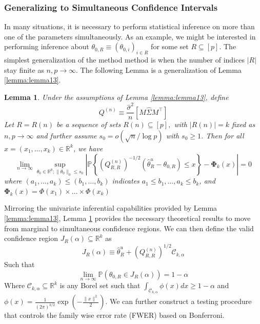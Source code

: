 \documentclass{article}
\newtheorem{lemma}[theorem]{Lemma}
\begin{document}
\subsubsection{Generalizing to Simultaneous Confidence Intervals}
\label{sec:2.3.3}
In many situations, it is necessary to perform statistical inference on more than one of the parameters simultaneously. As an example, we might be interested in performing inference about $\theta_{0,R}\equiv (\theta_{0,i})_{i \in R}$ for some set $R \subseteq [p]$. The simplest generalization of the method method is when the number of indices $|R|$ stay finite as $n, p \to \infty$. The following Lemma is a generalization of Lemma \ref{lemma:lemma13}.
\begin{lemma}
\label{lemma:lemma19}
Under the assumptions of Lemma \ref{lemma:lemma13}, define 
\begin{equation}
Q^{(n)} \equiv \frac{\hat{\sigma}^2}{n}[M \hat{\Sigma}M^\top]
\end{equation}
Let $R=R(n)$ be a sequence of sets $R(n) \subseteq [p],$ with $|R(n)| = k$ fixed as $n, p \to \infty$ and further assume $s_0 = o(\sqrt{n}/\log p)$ with $s_0\ge1$. Then for all $x = (x_1, \dots, x_k) \in \mathbb{R}^k$, we have
\begin{equation}
    \lim_{n \to \infty}\sup_{\theta_0 \in \mathbb{R}^p; \|\theta_0\|_0 \le s_0}\left|\mathbb{P}\left\{\left(Q^{(n)}_{R,R}\right)^{-1/2} (\hat{\theta}^u_R - \theta_{0, R}) \le x \right\}  -\mathbf{\Phi}_k(x)\right| =0
\end{equation}
where $(a_1, \dots, a_k) \le (b_1, \dots, b_k)$ indicates $a_1 \le b_1, \dots, a_k \le b_k$, and $\mathbf{\Phi}_k(x) = \Phi(x_1) \times \dots \times\Phi(x_k)$
\end{lemma}
\noindent
Mirroring the univariate inferential capabilities provided by Lemma \ref{lemma:lemma13}, Lemma \ref{lemma:lemma19} provides the necessary theoretical results to move from marginal to simultaneous confidence regions. We can then define the valid confidence region $J_R(\alpha) \subseteq \mathbb{R}^k$ as 
\begin{equation}
    J_{R}(\alpha) \equiv \hat{\theta}_R^u + (Q^{(n)}_{R,R})^{1/2}\mathcal{C}_{k,\alpha}
\end{equation}
Such that 
\begin{equation}
    \lim_{n \to \infty} \mathbb{P}\left(\theta_{0, R} \in J_R(\alpha)\right)= 1-\alpha
\end{equation}
Where $\mathcal{C}_{k, \alpha}\subseteq \mathbb{R}^k$ is any Borel set such that $\int_{\mathcal{C}_{k, \alpha}} \phi(x) dx \ge 1-\alpha$ and $\phi(x) = \frac{1}{(2\pi)^{k/2}}\exp \left(- \frac{\|x\|^2}{2}\right)$. We can further construct a testing procedure that controls the family wise error rate (FWER) based on Bonferroni.
\end{document}
